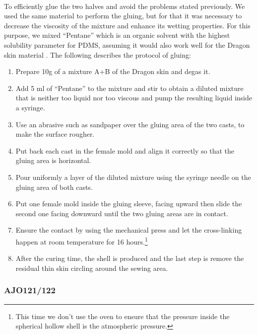 \paragraph{} 
To efficiently glue the two halves and avoid the problems stated previously. We used the same material to perform the gluing, but for that it was necessary to decrease the viscosity of the mixture and enhance its wetting properties. For this purpose, we mixed "`Pentane"' which is an organic solvent \cite{NgLee2003} with the highest solubility parameter for PDMS, assuming it would also work well for the Dragon skin material .
The following describes the protocol of gluing:
\begin{enumerate}
	\item Prepare 10g of a mixture A+B of the Dragon skin and degas it.
	\item Add 5 ml of "`Pentane"' to the mixture and stir to obtain a diluted mixture that is neither too liquid nor too viscous and pump the resulting liquid inside a syringe.
	\item Use an abrasive such as sandpaper over the gluing area of the two casts, to make the surface rougher.
	\item Put back each cast in the female mold and align it correctly so that the gluing area is horizontal.
	\item Pour uniformly a layer of the diluted mixture using the syringe needle on the gluing area of both casts.
	\item Put one female mold inside the gluing sleeve, facing upward then slide the second one facing downward until the two gluing areas are in contact.
	\item Ensure the contact by using the mechanical press and let the cross-linking happen at room temperature for 16 hours.\footnote{This time we don't use the oven to ensure that the pressure inside the spherical hollow shell is the atmospheric pressure.}
	\item After the curing time, the shell is produced and the last step is remove the residual thin skin circling around the sewing area.
\end{enumerate}
  

\subsubsection{AJO121/122}
